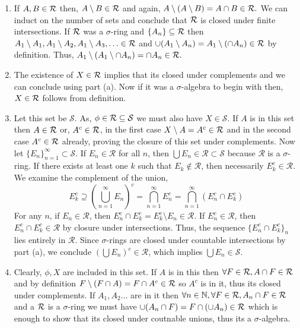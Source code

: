 \documentclass[12pt,a4paper]{article}
\begin{document}
\begin{solution}
\begin{enumerate}[label=\alph*.]
    \item If $A,B\in\mathcal{R}$ then, $A\setminus B\in\mathcal{R}$ and again, $A\setminus(A\setminus B)=A\cap B\in\mathcal{R}.$ 
    We can induct on the number of sets and conclude that $\mathcal{R}$ is closed under finite intersections. 
    If $\mathcal{R}$ was a $\sigma$-ring and $\{A_n\}\subseteq\mathcal{R}$ then $A_1\setminus A_1,A_1\setminus A_2,A_1\setminus A_3,\ldots\in\mathcal{R}$ and $\cup (A_1\setminus A_n)=A_1\setminus(\cap A_n)\in\mathcal{R}$ by definition. 
    Thus, $A_1\setminus(A_1\setminus \cap A_n)=\cap A_n\in\mathcal{R}.$
    \item The existence of $X\in\mathcal{R}$ implies that its closed under complements and we can conclude using part (a). 
    Now if it was a $\sigma$-algebra to begin with then, $X\in\mathcal{R}$ follows from definition. 
    \item Let this set be $\mathcal S$.
    As, $\phi\in\mathcal{R}\subseteq\mathcal S$ we must also have $X\in\mathcal S.$ 
    If $A$ is in this set then $A\in\mathcal{R}$ or, $A^c\in\mathcal{R}$, in the first case $X\setminus A=A^c\in\mathcal{R}$ and in the second case $A^c\in\mathcal{R}$ already, proving the closure of this set under complements. 
    Now let $\{E_n\}_{n=1}^{\infty} \subset \mathcal{S}$. 
    If $E_n \in \mathcal{R}$ for all $n$, then $\bigcup E_n \in \mathcal{R} \subset \mathcal{S}$ because $\mathcal{R}$ is a $\sigma$-ring. 
    If there exists at least one $k$ such that $E_k \notin \mathcal{R}$, then necessarily $E_k^c \in \mathcal{R}$. 
    We examine the complement of the union, 
    $$E^c_k\supseteq\left(\bigcup_{n=1}^\infty E_n\right)^c = \bigcap_{n=1}^\infty E_n^c = \bigcap_{n=1}^\infty (E_n^c \cap E_k^c)$$
    For any $n$, if $E_n \in \mathcal{R}$, then $E_n^c \cap E_k^c = E_k^c \setminus E_n \in \mathcal{R}$. If $E_n^c \in \mathcal{R}$, then $E_n^c \cap E_k^c \in \mathcal{R}$ by closure under intersections. 
    Thus, the sequence $\{E_n^c \cap E_k^c\}_n$ lies entirely in $\mathcal{R}$. Since $\sigma$-rings are closed under countable intersections by part (a), we conclude $(\bigcup E_n)^c \in \mathcal{R}$, which implies $\bigcup E_n \in \mathcal{S}$.
    \item Clearly, $\phi,X$ are included in this set. If $A$ is in this then $\forall F\in\mathcal{R},A\cap F\in\mathcal{R}$ and by definition $F\setminus (F\cap A)=F\cap A^c\in\mathcal{R}$ so $A^c$ is in it, thus its closed under complements. 
    If $A_1,A_2\ldots$ are in it then $\forall n\in\mathbb{N},\forall F\in\mathcal{R},A_n\cap F\in\mathcal{R}$ and a $\mathcal{R}$ is a $\sigma$-ring we must have $\cup(A_n\cap F)=F\cap(\cup A_n)\in\mathcal{R}$ which is enough to show that its closed under coutnable unions, thus its a $\sigma$-algebra.
\end{enumerate}
\end{solution}
\end{document}
